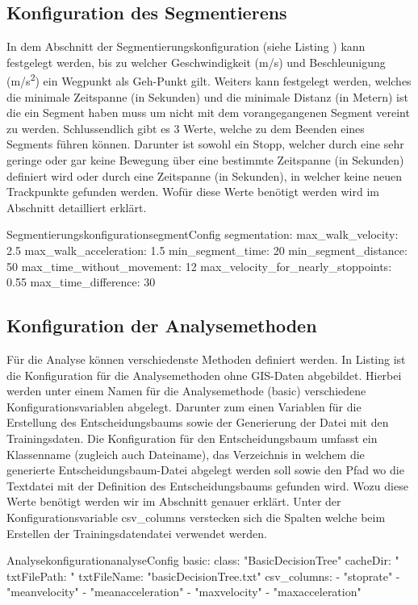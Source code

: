 \subsection{Konfiguration des Segmentierens}
In dem Abschnitt der Segmentierungskonfiguration (siehe Listing ) kann festgelegt werden, bis zu welcher Geschwindigkeit (m/s) und Beschleunigung (m/s\textsuperscript{2}) ein Wegpunkt als Geh-Punkt gilt. Weiters kann festgelegt werden, welches die minimale Zeitspanne (in Sekunden) und die minimale Distanz (in Metern) ist die ein Segment haben muss um nicht mit dem vorangegangenen Segment vereint zu werden. Schlussendlich gibt es 3 Werte, welche zu dem Beenden eines Segments führen können. Darunter ist sowohl ein Stopp, welcher durch eine sehr geringe oder gar keine Bewegung über eine bestimmte Zeitspanne (in Sekunden) definiert wird oder durch eine Zeitspanne (in Sekunden), in welcher keine neuen Trackpunkte gefunden werden. Wofür diese Werte benötigt werden wird im Abschnitt  detailliert erklärt.

\begin{code}[]{Segmentierungskonfiguration}{segmentConfig}
  segmentation:
    max_walk_velocity: 2.5
    max_walk_acceleration: 1.5
    min_segment_time: 20
    min_segment_distance: 50
    max_time_without_movement: 12
    max_velocity_for_nearly_stoppoints: 0.55
    max_time_difference: 30
\end{code}

\subsection{Konfiguration der Analysemethoden}
Für die Analyse können verschiedenste Methoden definiert werden. In Listing  ist die Konfiguration für die Analysemethoden ohne GIS-Daten abgebildet. Hierbei werden unter einem Namen für die Analysemethode (basic) verschiedene Konfigurationsvariablen abgelegt. Darunter zum einen Variablen für die Erstellung des Entscheidungsbaums sowie der Generierung der Datei mit den Trainingsdaten. Die Konfiguration für den Entscheidungsbaum umfasst ein Klassenname (zugleich auch Dateiname), das Verzeichnis in welchem die generierte Entscheidungsbaum-Datei abgelegt werden soll sowie den Pfad wo die Textdatei mit der Definition des Entscheidungsbaums gefunden wird. Wozu diese Werte benötigt werden wir im Abschnitt  genauer erklärt. Unter der Konfigurationsvariable csv\_columns verstecken sich die Spalten welche beim Erstellen der Trainingsdatendatei verwendet werden.

\begin{code}[]{Analysekonfiguration}{analyseConfig}
    basic:
      class: "BasicDecisionTree"
      cacheDir: "%
      txtFilePath: "%
      txtFileName: "basicDecisionTree.txt"
      csv_columns:
        - "stoprate"
        - "meanvelocity"
        - "meanacceleration"
        - "maxvelocity"
        - "maxacceleration"
\end{code}
